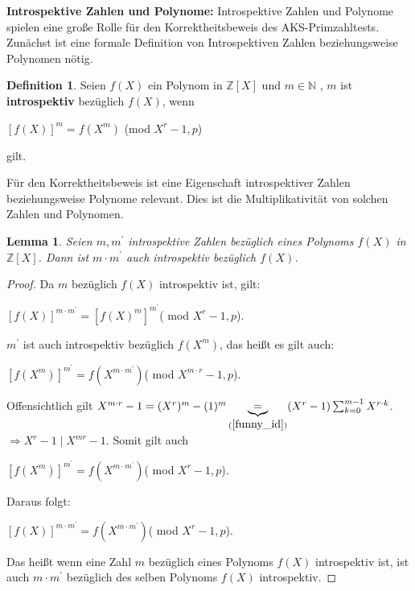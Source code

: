 \documentclass[12pt,oneside]{article}
\newtheorem{lemma}[theorem]{Lemma}
\theoremstyle{remark}
\theoremstyle{definition}
\newtheorem{definition}{Definition}[section]
\begin{document}
\textbf{Introspektive Zahlen und Polynome:}
Introspektive Zahlen und Polynome spielen eine große Rolle für den Korrektheitsbeweis des AKS-Primzahltests. Zunächst ist eine formale Definition von Introspektiven Zahlen beziehungsweise Polynomen nötig.

\begin{definition}
Seien $f(X)$ ein Polynom in $\mathbb{Z}[X]$ und $m \in \mathbb{N}$ , $m$ ist \textbf{introspektiv} bezüglich $f(X)$, wenn\newline\newline
    \centerline{$[f(X)]^{m} = f(X^m)$ (mod $X^r - 1,p$)} 
gilt. 
\end{definition}

Für den Korrektheitsbeweis ist eine Eigenschaft introspektiver Zahlen beziehungsweise Polynome relevant. Dies ist die Multiplikativität von solchen Zahlen und Polynomen.\newline\newline

\begin{lemma}\label{intros_num}
Seien $m,m^{'}$ introspektive Zahlen bezüglich eines Polynoms $f(X)$ in $\mathbb{Z}[X]$. Dann ist $m \cdot m^{'}$ auch introspektiv bezüglich $f(X)$.
\end{lemma}

\begin{proof}
Da $m$ bezüglich $f(X)$ introspektiv ist, gilt:\newline\newline
\centerline{$[f(X)]^{m \cdot m^{'}} = [f(X)^{m}]^{m^{'}}$( mod $X^r - 1, p$).}\newline\newline
$m^{'}$ ist auch introspektiv bezüglich $f(X^{m})$, das heißt es gilt auch:\newline\newline
\centerline{$[f(X^m)]^{m^{'}} = f(X^{m \cdot m^{'}})$( mod $X^{m\cdot r} - 1, p$).}\newline\newline

Offensichtlich gilt $X^{m \cdot r } - 1 = (X^{r})^{m} - (1)^m \underbrace{=}_{(\ref{funny_id})} (X^{r} - 1) \sum_{k = 0}^{m-1} X^{r \cdot k}$.\newline\newline$\Rightarrow X^{r} - 1\mid X^{mr} - 1$. Somit gilt auch\newline\newline
\centerline{$[f(X^m)]^{m^{'}} = f(X^{m \cdot m^{'}})$( mod $X^{r} - 1,p$).}\newline

Daraus folgt:\newline\newline
\centerline{$[f(X)]^{m \cdot m^{'}} = f(X^{m \cdot m^{'}}) $( mod $X^r - 1, p$).}\newline

Das heißt wenn eine Zahl $m$ bezüglich eines Polynoms $f(X)$ introspektiv ist, ist auch $m \cdot m^{'}$ bezüglich des selben Polynoms $f(X)$ introspektiv. 
\end{proof}
\end{document}
